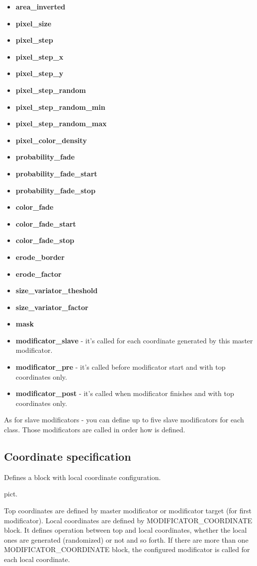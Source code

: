 \documentclass[9pt]{article}
\begin{document}
\begin{itemize}
\item{\bf area\_inverted}
\item{\bf pixel\_size}
\item{\bf pixel\_step}
\item{\bf pixel\_step\_x}
\item{\bf pixel\_step\_y}
\item{\bf pixel\_step\_random}
\item{\bf pixel\_step\_random\_min}
\item{\bf pixel\_step\_random\_max}
\item{\bf pixel\_color\_density}
\item{\bf probability\_fade}
\item{\bf probability\_fade\_start}
\item{\bf probability\_fade\_stop}
\item{\bf color\_fade}
\item{\bf color\_fade\_start}
\item{\bf color\_fade\_stop}
\item{\bf erode\_border}
\item{\bf erode\_factor}
\item{\bf size\_variator\_theshold}
\item{\bf size\_variator\_factor}
\item{\bf mask}
\end{itemize}
\begin{itemize}
\item{\bf modificator\_slave} - it's called for each coordinate generated 
by this master modificator.
\item{\bf modificator\_pre} - it's called before modificator start 
and with top coordinates only.
\item{\bf modificator\_post} - it's called when modificator finishes 
and with top coordinates only.
\end{itemize}
As for slave modificators - you can define up to five slave modificators for each class.
Those modificators are called in order how is defined.

\subsection{Coordinate specification}

Defines a block with local coordinate configuration.

pict.

Top coordinates are defined by master modificator or modificator target
(for first modificator). Local coordinates are defined by MODIFICATOR\_COORDINATE
block. It defines operation between top and local coordinates, whether the local
ones are generated (randomized) or not and so forth. If there are more than one
MODIFICATOR\_COORDINATE block, the configured modificator is called for each local
coordinate.
\end{document}
